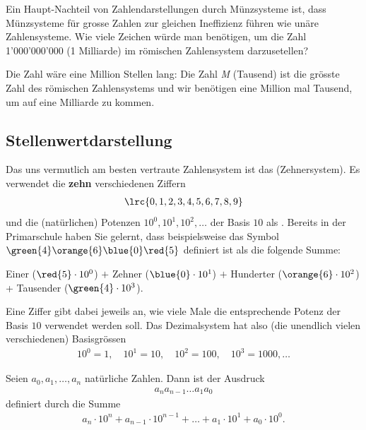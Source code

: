\begin{myexercise}\label{myexercise:grosse-roem-zahlen}
	Ein Haupt-Nachteil von Zahlendarstellungen durch Münzsysteme ist, dass Münzsysteme für grosse Zahlen zur gleichen Ineffizienz führen wie unäre Zahlensysteme. Wie viele Zeichen würde man benötigen, um die Zahl 1'000'000'000 (1 Milliarde) im römischen Zahlensystem darzusetellen?
	\begin{myanswer}
		Die Zahl wäre eine Million Stellen lang: Die Zahl \textit{M} (Tausend) ist die grösste Zahl des römischen Zahlensystems und wir benötigen eine Million mal Tausend, um auf eine Milliarde zu kommen.
	\end{myanswer}
\end{myexercise}
\subsection{Stellenwertdarstellung}
\label{subsec:stellenwertdarst}
Das uns vermutlich am besten vertraute Zahlensystem ist das 
(Zehnersystem). Es verwendet die \textbf{zehn} verschiedenen Ziffern
\begin{align*}
	\lrc{0,1,2,3,4,5,6,7,8,9}
\end{align*}
und die (natürlichen) Potenzen $10^0, 10^1, 10^2, \ldots$ der Basis $10$ als .
Bereits in der Primarschule haben Sie gelernt, dass beispielsweise das Symbol $\green{4}\orange{6}\blue{0}\red{5}$ definiert ist als die folgende
Summe:
\begin{center}
	 Einer ($\red{5}\cdot 10^0$) $+$  Zehner ($\blue{0}\cdot 10^1$) $+$  Hunderter
	($\orange{6}\cdot 10^2$) +  Tausender
	($\green{4}\cdot 10^3$).
\end{center}
Eine Ziffer gibt dabei jeweils an, wie viele Male die entsprechende Potenz der Basis $10$ verwendet werden soll. Das
Dezimalsystem hat also (die unendlich vielen verschiedenen) Basisgrössen
\begin{align*}
	10^0=1,\quad 10^1=10,\quad 10^2=100,\quad 10^3=1000,\ldots
\end{align*}

\begin{mydefinition}\label{mydefinition:Stellenwertdarstellung}
Seien $a_0, a_1, \ldots, a_n$ natürliche Zahlen. Dann ist der Ausdruck
\begin{align*}
	a_na_{n-1}\ldots a_1a_0
\end{align*}
definiert durch die Summe
\begin{align*}
	a_n\cdot 10^n + a_{n-1}\cdot 10^{n-1}+\ldots + a_1\cdot 10^1 + a_0\cdot 10^0.
\end{align*}
\end{mydefinition}

